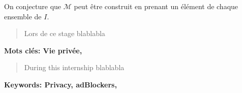 \documentclass[oneside,a4paper,12pt]{article}
\begin{document}
On conjecture que $\mathcal{M}$ peut être construit en prenant un élément de chaque ensemble de $I$.

\newpage

\printbibliography

\newpage

\begin{center}
	
	\vspace{2cm}
	\renewcommand{\abstractname}{Résumé}
	\begin{abstract}
	
	Lors de ce stage blablabla

	\end{abstract}
	\textbf{Mots clés: Vie privée, }
	\vspace{\fill}	
	\renewcommand{\abstractname}{Abstract}
	\begin{abstract}
	
	During this internship blablabla

	\end{abstract}
	\textbf{Keywords: Privacy, adBlockers, }
	\vspace{2cm}

\end{center}
\end{document}
